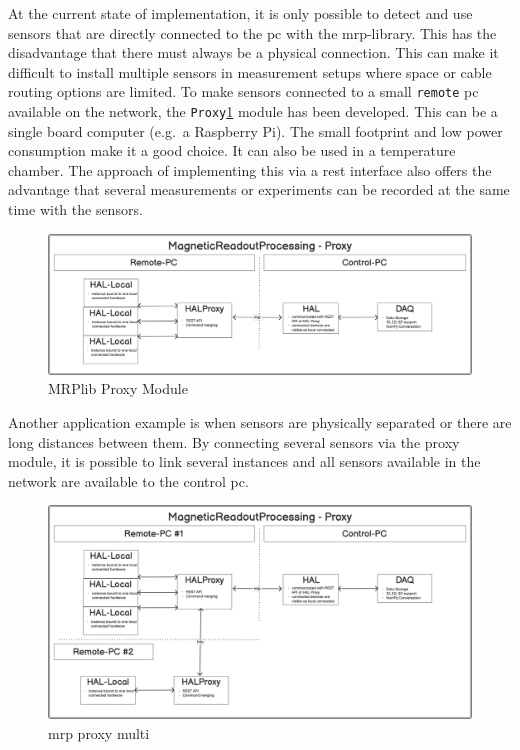 At the current state of implementation, it is only possible to detect
and use sensors that are directly connected to the \gls{pc} with the
\gls{mrp}-library. This has the disadvantage that there must always be a
physical connection. This can make it difficult to install multiple
sensors in measurement setups where space or cable routing options are
limited. To make sensors connected to a small
\passthrough{\lstinline!remote!} \gls{pc} available on the network, the
\passthrough{\lstinline!Proxy!}\ref{MRPlib_Proxy_Module.png} module has
been developed. This can be a single board computer (e.g.~a Raspberry
Pi). The small footprint and low power consumption make it a good
choice. It can also be used in a temperature chamber. The approach of
implementing this via a \gls{rest} interface also offers the advantage
that several measurements or experiments can be recorded at the same
time with the sensors.

\begin{figure}
\centering
\includegraphics{./generated_images/border_MRPlib_Proxy_Module.png}
\caption{MRPlib Proxy Module \label{MRPlib_Proxy_Module.png}}
\end{figure}

Another application example is when sensors are physically separated or
there are long distances between them. By connecting several sensors via
the proxy module, it is possible to link several instances and all
sensors available in the network are available to the control \gls{pc}.

\begin{figure}
\centering
\includegraphics{./generated_images/border_mrp_proxy_multi.png}
\caption{mrp proxy multi \label{mrp_proxy_multi.png}}
\end{figure}

